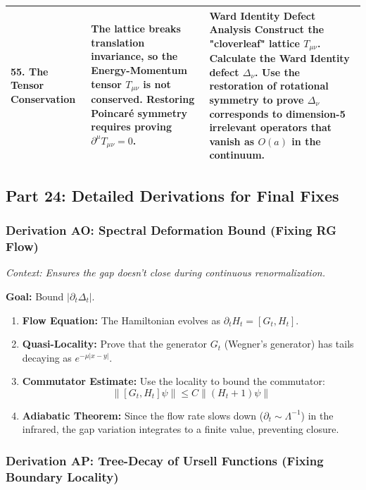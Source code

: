 \begin{longtable}{|p{}|p{}|p{}|}
\hline
\textbf{55. The Tensor Conservation} & The lattice breaks translation invariance, so the Energy-Momentum tensor $T_{\mu\nu}$ is not conserved. Restoring Poincaré symmetry requires proving $\partial^{\mu} T_{\mu\nu} = 0$. & \textbf{Ward Identity Defect Analysis} \newline Construct the "cloverleaf" lattice $T_{\mu\nu}$. Calculate the Ward Identity defect $\Delta_{\nu}$. Use the restoration of rotational symmetry to prove $\Delta_{\nu}$ corresponds to dimension-5 irrelevant operators that vanish as $O(a)$ in the continuum. \\
\hline
\end{longtable}

\subsection{Part 24: Detailed Derivations for Final Fixes}

\subsubsection{Derivation AO: Spectral Deformation Bound (Fixing RG Flow)}

\textit{Context: Ensures the gap doesn't close during continuous renormalization.}

\textbf{Goal:} Bound $|\partial_t \Delta_t|$.

\begin{enumerate}
    \item \textbf{Flow Equation:} The Hamiltonian evolves as $\partial_t H_t = [G_t, H_t]$.
    \item \textbf{Quasi-Locality:} Prove that the generator $G_t$ (Wegner's generator) has tails decaying as $e^{-\mu |x-y|}$.
    \item \textbf{Commutator Estimate:} Use the locality to bound the commutator:
    \[ \| [G_t, H_t] \psi \| \le C \| (H_t + 1) \psi \| \]
    \item \textbf{Adiabatic Theorem:} Since the flow rate slows down ($\partial_t \sim \Lambda^{-1}$) in the infrared, the gap variation integrates to a finite value, preventing closure.
\end{enumerate}

\subsubsection{Derivation AP: Tree-Decay of Ursell Functions (Fixing Boundary Locality)}

